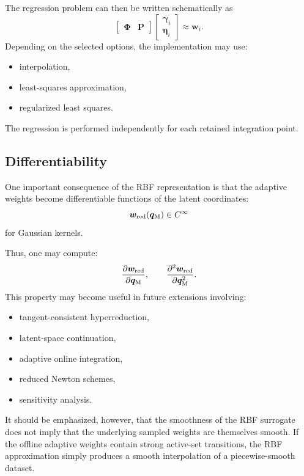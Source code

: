 \documentclass[11pt,a4paper]{article}
\begin{document}
The regression problem can then be written schematically as
\[
        \begin{bmatrix}
        \bm\Phi & \bm P
        \end{bmatrix}
        \begin{bmatrix}
        \bm\gamma_i\\
        \bm\eta_i
        \end{bmatrix}
        \approx
        \bm w_i.
        \label{eq:rbf_linear_system}
\]
Depending on the selected options, the implementation may use:
\begin{itemize}
    \item interpolation,
    \item least-squares approximation,
    \item regularized least squares.
\end{itemize}

The regression is performed independently for each retained integration point.

\subsection{Differentiability}

One important consequence of the RBF representation is that the adaptive
weights become differentiable functions of the latent coordinates:
\[
        \bm w_{\mathrm{red}}(\bm q_{\mathrm{M}})
        \in
        C^\infty
\]
for Gaussian kernels.

Thus, one may compute:
\[
        \frac{\partial \bm w_{\mathrm{red}}}{\partial \bm q_{\mathrm{M}}},
        \qquad
        \frac{\partial^2 \bm w_{\mathrm{red}}}{\partial \bm q_{\mathrm{M}}^2}.
\]
This property may become useful in future extensions involving:
\begin{itemize}
    \item tangent-consistent hyperreduction,
    \item latent-space continuation,
    \item adaptive online integration,
    \item reduced Newton schemes,
    \item sensitivity analysis.
\end{itemize}

It should be emphasized, however, that the smoothness of the RBF surrogate does
not imply that the underlying sampled weights are themselves smooth. If the
offline adaptive weights contain strong active-set transitions, the RBF
approximation simply produces a smooth interpolation of a piecewise-smooth
dataset.
\end{document}
